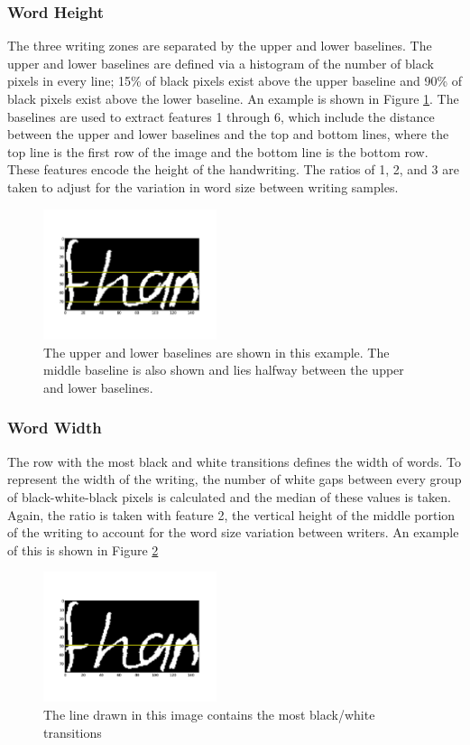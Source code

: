 \documentclass[paper=a4, fontsize=11pt]{scrartcl} %
\numberwithin{equation}{section} %
\numberwithin{figure}{section} %
\numberwithin{table}{section} %
\begin{document}
\subsubsection{Word Height}
The three writing zones are separated by the upper and lower
baselines. The upper and lower baselines are defined via a histogram of the number of black pixels in every line; 15\% of black pixels exist above the upper baseline and 90\% of black pixels
exist above the lower baseline. An example is shown in Figure
\ref{fig:wordheight}. The baselines are used to extract features 1
through 6, which include the distance between the upper and lower baselines and the top and bottom lines, where the top line is the first row of the image and the bottom line is the bottom row. These features encode the height of the handwriting. The ratios of 1, 2, and 3 are taken to adjust for the variation in word size between writing samples.

\begin{figure}
  \centering \includegraphics[width=2in]{wordheight.png}
  \caption{The upper and lower baselines are shown in this
    example. The middle baseline is also shown and lies halfway between the upper and lower
    baselines.}
  \label{fig:wordheight}
\end{figure}

\subsubsection{Word Width}
The row with the most black and white transitions defines the width of
words. To represent the width of the writing, the number of white gaps
between every group of black-white-black pixels is calculated and the
median of these values is taken. Again, the ratio is taken with feature 2,
the vertical height of the middle portion of the writing to account
for the word size variation between writers. An example of this is
shown in Figure \ref{fig:wordwidth}

\begin{figure}
  \centering \includegraphics[width=2in]{wordwidth.png}
  \caption{The line drawn in this image contains the most black/white
    transitions}
  \label{fig:wordwidth}
\end{figure}
\end{document}
